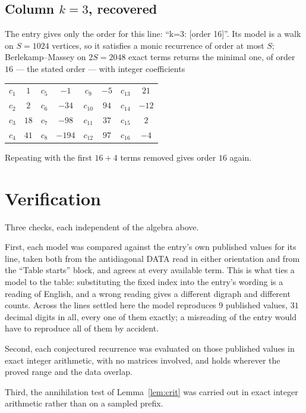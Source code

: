 \documentclass[11pt,a4paper]{article}
\theoremstyle{plain}
\theoremstyle{definition}
\begin{document}
\subsection*{Column $k=3$, recovered}
The entry gives only the order for this line: ``k=3: [order 16]''. Its model is a walk on
$S=1024$ vertices, so it satisfies a monic recurrence of order at most $S$;
Berlekamp--Massey on $2S=2048$ exact terms returns the minimal one, of order
$16$ --- the stated order --- with integer coefficients
\begin{center}\small\begin{tabular}{cccccccc}
$c_{1}$ & $1$ & $c_{5}$ & $-1$ & $c_{9}$ & $-5$ & $c_{13}$ & $21$ \\
$c_{2}$ & $2$ & $c_{6}$ & $-34$ & $c_{10}$ & $94$ & $c_{14}$ & $-12$ \\
$c_{3}$ & $18$ & $c_{7}$ & $-98$ & $c_{11}$ & $37$ & $c_{15}$ & $2$ \\
$c_{4}$ & $41$ & $c_{8}$ & $-194$ & $c_{12}$ & $97$ & $c_{16}$ & $-4$ \\
\end{tabular}\end{center}
Repeating with the first $16+4$ terms removed gives order $16$ again.

\section{Verification}

Three checks, each independent of the algebra above.

First, each model was compared against the entry's own published values for its line, taken
both from the antidiagonal DATA read in either orientation and from the ``Table starts''
block, and agrees at every available term. This is what ties a model to the table:
substituting the fixed index into the entry's wording is a reading of English, and a wrong
reading gives a different digraph and different counts. Across the lines settled here the
model reproduces $9$ published values, $31$ decimal digits in all, every one of
them exactly; a misreading of the entry would have to reproduce all of them by accident.

Second, each conjectured recurrence was evaluated on those published values in exact
integer arithmetic, with no matrices involved, and holds wherever the proved range and the
data overlap.

Third, the annihilation test of Lemma~\ref{lem:crit} was carried out in exact integer
arithmetic rather than on a sampled prefix.
\end{document}
